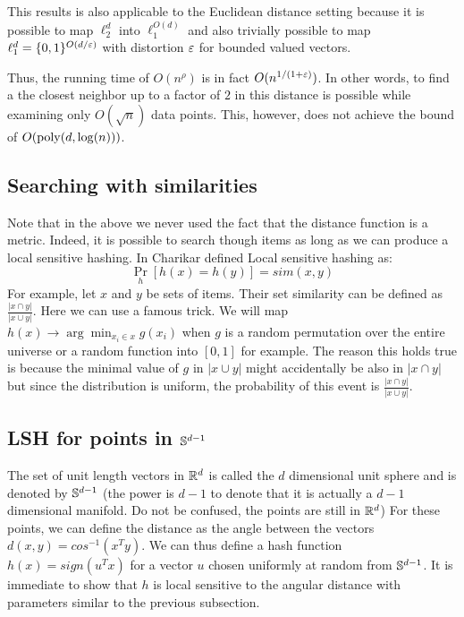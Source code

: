 \documentclass{article}
\begin{document}
\begin{remark}
This results is also applicable to the Euclidean distance setting because it is possible
to map $\ell_{2}^{d}$ into $\ell_{1}^{O(d)}$ and also trivially possible to map $\ell_{1}^{d} = \{0,1\}^{O(d/\varepsilon)}$ with distortion 
$\varepsilon$ for bounded valued vectors. 
\end{remark}


Thus, the running time of $O(n^{\rho})$ is in fact $O(n^{1/(1+\varepsilon)})$. In other words, to find a
the closest neighbor up to a factor of $2$ in this distance is possible while examining only $O(\sqrt{n})$ data points.
This, however, does not achieve the bound of $O({\operatorname{poly}}(d,\log(n)))$.  

\subsection{Searching with similarities}
Note that in the above we never used the fact that the distance function is a metric. 
Indeed, it is possible to search though items as long as we can produce a local sensitive hashing.
In \cite{Charikar02} Charikar defined Local sensitive hashing as:
\[
\Pr_{h}[h(x)=h(y)] = sim(x,y)
\]
For example, let $x$ and $y$ be sets of items. Their set similarity can be defined as $\frac{| x \cap y|}{|x \cup y|}$.
Here we can use a famous trick. We will map $h(x) \rightarrow \arg \min_{x_i \in x} g(x_i)$ when $g$ is a random permutation over
the entire universe or a random function into $[0,1]$ for example. The reason this holds true is because 
the minimal value of $g$ in $|x \cup y|$ might accidentally be also in $| x \cap y|$ but 
since the distribution is uniform, the probability of this event is $\frac{| x \cap y|}{|x \cup y|}$.
 
 \subsection{LSH for points in ${\mathbb{S}}^{d-1}$}
The set of unit length vectors in ${\mathbb{R}}^{d}$ is called the $d$ dimensional unit sphere and is denoted by  ${\mathbb{S}}^{d-1}$
(the power is $d-1$ to denote that it is actually a $d-1$ dimensional manifold. Do not be confused, the points are still in ${\mathbb{R}}^d$)
For these points, we can define the distance as the angle between the vectors $d(x,y) = cos^{-1}(x^{T}y)$.
We can thus define a hash function $h(x) = sign(u^{T}x)$ for a vector $u$ chosen uniformly at random from ${\mathbb{S}}^{d-1}$.
It is immediate to show that $h$ is local sensitive to the angular distance with parameters similar to the previous subsection.



\end{document}
